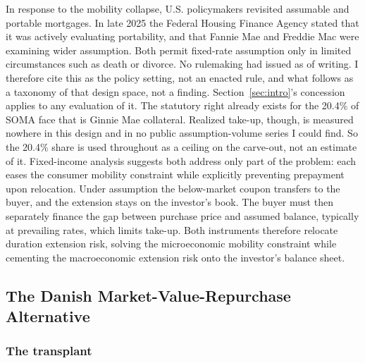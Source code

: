 \documentclass[12pt]{article}
\begin{document}
In response to the mobility collapse, U.S. policymakers revisited assumable and portable mortgages. In late 2025 the Federal Housing Finance Agency stated that it was actively evaluating portability, and that Fannie Mae and Freddie Mac were examining wider assumption. Both permit fixed-rate assumption only in limited circumstances such as death or divorce. No rulemaking had issued as of writing. I therefore cite this as the policy setting, not an enacted rule, and what follows as a taxonomy of that design space, not a finding. Section~\ref{sec:intro}'s concession applies to any evaluation of it. The statutory right already exists for the 20.4\% of SOMA face that is Ginnie Mae collateral. Realized take-up, though, is measured nowhere in this design and in no public assumption-volume series I could find. So the 20.4\% share is used throughout as a ceiling on the carve-out, not an estimate of it. Fixed-income analysis suggests both address only part of the problem: each eases the consumer mobility constraint while explicitly preventing prepayment upon relocation. Under assumption the below-market coupon transfers to the buyer, and the extension stays on the investor's book. The buyer must then separately finance the gap between purchase price and assumed balance, typically at prevailing rates, which limits take-up. Both instruments therefore relocate duration extension risk, solving the microeconomic mobility constraint while cementing the macroeconomic extension risk onto the investor's balance sheet.

\subsection{The Danish Market-Value-Repurchase Alternative}\label{sec:abm-danish}

\subsubsection{The transplant}
\end{document}
